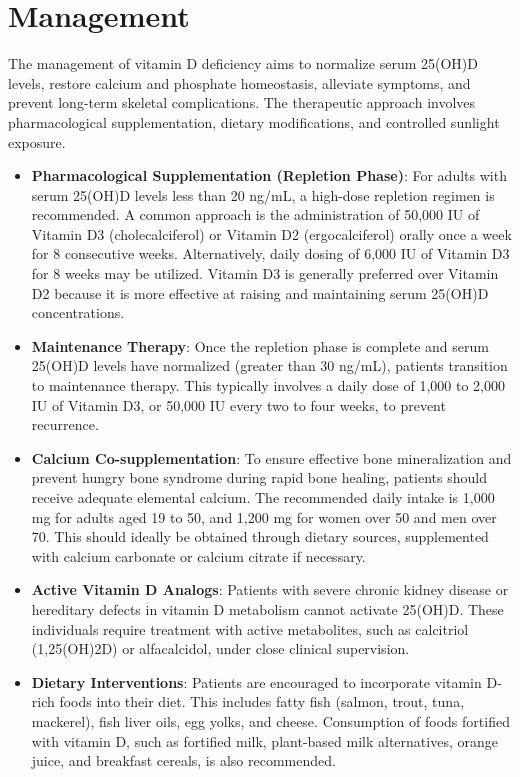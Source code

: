 \section*{Management}
The management of vitamin D deficiency aims to normalize serum 25(OH)D levels, restore calcium and phosphate homeostasis, alleviate symptoms, and prevent long-term skeletal complications. The therapeutic approach involves pharmacological supplementation, dietary modifications, and controlled sunlight exposure.

\begin{itemize}
    \item \textbf{Pharmacological Supplementation (Repletion Phase)}: For adults with serum 25(OH)D levels less than 20 ng/mL, a high-dose repletion regimen is recommended. A common approach is the administration of 50,000 IU of Vitamin D3 (cholecalciferol) or Vitamin D2 (ergocalciferol) orally once a week for 8 consecutive weeks. Alternatively, daily dosing of 6,000 IU of Vitamin D3 for 8 weeks may be utilized. Vitamin D3 is generally preferred over Vitamin D2 because it is more effective at raising and maintaining serum 25(OH)D concentrations.
    \item \textbf{Maintenance Therapy}: Once the repletion phase is complete and serum 25(OH)D levels have normalized (greater than 30 ng/mL), patients transition to maintenance therapy. This typically involves a daily dose of 1,000 to 2,000 IU of Vitamin D3, or 50,000 IU every two to four weeks, to prevent recurrence.
    \item \textbf{Calcium Co-supplementation}: To ensure effective bone mineralization and prevent hungry bone syndrome during rapid bone healing, patients should receive adequate elemental calcium. The recommended daily intake is 1,000 mg for adults aged 19 to 50, and 1,200 mg for women over 50 and men over 70. This should ideally be obtained through dietary sources, supplemented with calcium carbonate or calcium citrate if necessary.
    \item \textbf{Active Vitamin D Analogs}: Patients with severe chronic kidney disease or hereditary defects in vitamin D metabolism cannot activate 25(OH)D. These individuals require treatment with active metabolites, such as calcitriol (1,25(OH)2D) or alfacalcidol, under close clinical supervision.
    \item \textbf{Dietary Interventions}: Patients are encouraged to incorporate vitamin D-rich foods into their diet. This includes fatty fish (salmon, trout, tuna, mackerel), fish liver oils, egg yolks, and cheese. Consumption of foods fortified with vitamin D, such as fortified milk, plant-based milk alternatives, orange juice, and breakfast cereals, is also recommended.

\end{itemize}
